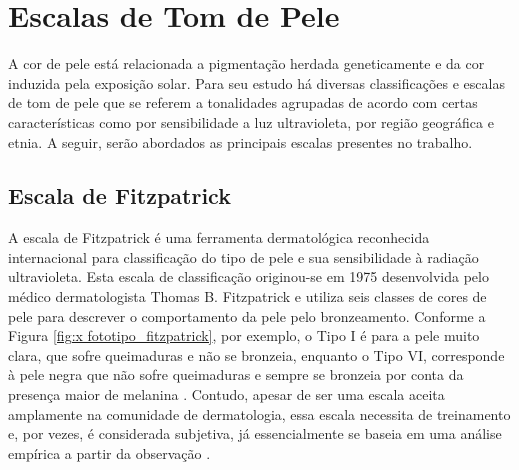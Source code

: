\section{Escalas de Tom de Pele}
 
A cor de pele está relacionada a pigmentação herdada geneticamente e da cor induzida pela exposição solar. Para seu estudo há diversas classificações e escalas de tom de pele que se referem a tonalidades agrupadas de acordo com certas características como por sensibilidade a luz ultravioleta, por região geográfica e etnia. A seguir, serão abordados as principais escalas presentes no trabalho.


\subsection{Escala de Fitzpatrick}
A escala de Fitzpatrick é uma ferramenta dermatológica reconhecida internacional para classificação do tipo de pele e sua sensibilidade à radiação ultravioleta. Esta escala de classificação originou-se em 1975 desenvolvida pelo médico dermatologista Thomas B. Fitzpatrick e  utiliza seis classes de cores de pele para descrever o comportamento da pele pelo bronzeamento. Conforme a Figura \ref{fig:x fototipo_fitzpatrick},  por exemplo,  o  Tipo  I  é  para  a  pele  muito  clara, que sofre queimaduras e não se  bronzeia, enquanto   o   Tipo   VI,   corresponde   à pele negra que  não sofre queimaduras  e  sempre  se bronzeia por conta da presença maior de melanina \cite{Fitzpatrick_1988}. Contudo, apesar de ser uma escala aceita amplamente na comunidade de dermatologia, essa escala necessita de treinamento e, por vezes, é considerada subjetiva, já essencialmente se baseia em uma análise empírica a partir da observação \cite{Classificao_de_fototipos_de_pele}.

